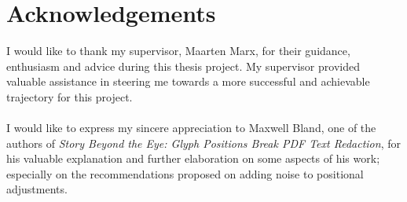 \chapter{Acknowledgements}
I would like to thank my supervisor, Maarten Marx, for their guidance, enthusiasm and advice during this thesis project. My supervisor provided valuable assistance in steering me towards a more successful and achievable trajectory for this project.
\\\\
I would like to express my sincere appreciation to Maxwell Bland, one of the authors of \textit{Story Beyond the Eye: Glyph Positions Break PDF Text Redaction}, for his valuable explanation and further elaboration on some aspects of his work; especially on the recommendations proposed on adding noise to positional adjustments.